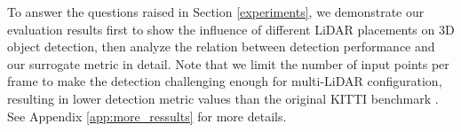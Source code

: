 \documentclass[10pt,twocolumn,letterpaper]{article}
\newcommand{\todo}[1]{\hl{[#1]}}
\begin{document}
To answer the questions raised in Section \ref{experiments}, we demonstrate our evaluation results first to  show the influence of different LiDAR placements on 3D object detection, then analyze the relation between detection performance and our surrogate metric in detail. Note that we limit the number of input points per frame to make the detection challenging enough for multi-LiDAR configuration, resulting in lower detection metric values than the original KITTI benchmark \cite{geiger2013vision}.  See Appendix \ref{app:more_ressults} for more details.

\begin{table}[]
\centering
{}
\caption{Influence of roll rotation of sided LiDARs (as Figure \ref{fig:baseline-line} shows) on Car detection performance.
}
\label{tab:expt4}
\vspace*{-5mm}
\end{table}
\end{document}
